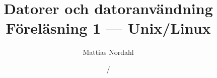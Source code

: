 \documentclass[handout]{beamer}
\author[]{Mattias Nordahl}
\institute{\url{mattias.nordahl@cs.lth.se}}
\date{}
\begin{document}
\title{Datorer och datoranvändning\\Föreläsning 1 --- Unix/Linux}

\frame[plain]{
    \maketitle
    \vspace{-2\baselineskip}
}

\date{\the\year/\the\numexpr{}}


\end{document}
